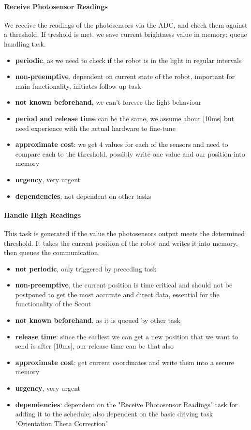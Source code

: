\documentclass[12pt]{article}
\begin{document}
\paragraph{Receive Photosensor Readings}
We receive the readings of the photosensors via the ADC, and check them against a threshold.
If treshold is met, we save current brightness value in memory; queue handling task.
\begin{itemize}
	\item \textbf{periodic}, as we need to check if the robot is in the light in regular intervals
	\item \textbf{non-preemptive}, dependent on current state of the robot, important for main functionality, initiates follow up task
	\item \textbf{not known beforehand}, we can't foresee the light behaviour
	\item \textbf{period and release time} can be the same, we assume about [10ms] but need experience with the actual hardware to fine-tune
	\item \textbf{approximate cost}: we get 4 values for each of the sensors and need to compare each to the threshold, possibly write one value and our position into memory 
	\item \textbf{urgency}, very urgent
	\item \textbf{dependencies}: not dependent on other tasks
\end{itemize}

\paragraph{Handle High Readings}
This task is generated if the value the photosensors output meets the determined threshold. It takes the current position of the robot and writes it into memory, then queues the communication.
\begin{itemize}
	\item \textbf{not periodic}, only triggered by preceding task
	\item \textbf{non-preemptive}, the current position is time critical and should not be postponed to get the most accurate and direct data, essential for the functionality of the Scout
	\item \textbf{not known beforehand}, as it is queued by other task
	\item \textbf{release time}: since the earliest we can get a new position that we want to send is after [10ms], our release time can be that also
	\item \textbf{approximate cost}: get current coordinates and write them into a secure memory
	\item \textbf{urgency}, very urgent
	\item \textbf{dependencies}: dependent on the "Receive Photosensor Readings" task for adding it to the schedule; also dependent on the basic driving task "Orientation Theta Correction"
\end{itemize}
\end{document}
